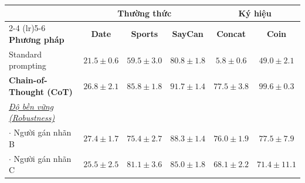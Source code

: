 \begin{tabular}{l ccc cc}
    \toprule
    & \multicolumn{3}{c}{\textbf{Thường thức}} & \multicolumn{2}{c}{\textbf{Ký hiệu}} \\
    \cmidrule(lr){2-4} \cmidrule(lr){5-6}
    \textbf{Phương pháp} & \textbf{Date} & \textbf{Sports} & \textbf{SayCan} & \textbf{Concat} & \textbf{Coin} \\
    \midrule
    Standard prompting & $21.5 \pm 0.6$ & $59.5 \pm 3.0$ & $80.8 \pm 1.8$ & $5.8 \pm 0.6$ & $49.0 \pm 2.1$ \\ 
    \textbf{Chain-of-Thought (CoT)} & $\mathbf{26.8 \pm 2.1}$ & $\mathbf{85.8 \pm 1.8}$ & $\mathbf{91.7 \pm 1.4}$ & $\mathbf{77.5 \pm 3.8}$ & $\mathbf{99.6 \pm 0.3}$ \\
    \midrule
    \textit{\underline{Độ bền vững (Robustness)}} & & & & & \\
    $\cdot$ Người gán nhãn B & $27.4 \pm 1.7$ & $75.4 \pm 2.7$ & $88.3 \pm 1.4$ & $76.0 \pm 1.9$ & $77.5 \pm 7.9$ \\
    $\cdot$ Người gán nhãn C & $25.5 \pm 2.5$ & $81.1 \pm 3.6$ & $85.0 \pm 1.8$ & $68.1 \pm 2.2$ & $71.4 \pm 11.1$ \\
    
    \bottomrule
\end{tabular}